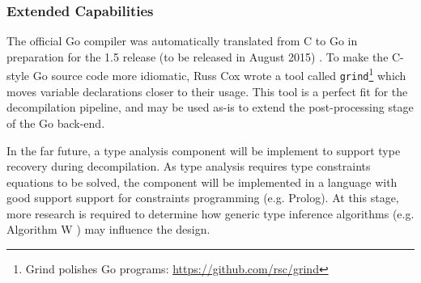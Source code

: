 
\subsubsection{Extended Capabilities}
\label{sec:con_extended_capabilities}

The official Go compiler was automatically translated from C to Go in preparation for the 1.5 release (to be released in August 2015) \cite{go_compiler_c2go}. To make the C-style Go source code more idiomatic, Russ Cox wrote a tool called \texttt{grind}\footnote{Grind polishes Go programs: \url{https://github.com/rsc/grind}} which moves variable declarations closer to their usage. This tool is a perfect fit for the decompilation pipeline, and may be used as-is to extend the post-processing stage of the Go back-end.

In the far future, a type analysis component will be implement to support type recovery during decompilation. As type analysis requires type constraints equations to be solved, the component will be implemented in a language with good support support for constraints programming (e.g. Prolog). At this stage, more research is required to determine how generic type inference algorithms (e.g. Algorithm W \cite{algorithm_w}) may influence the design.
